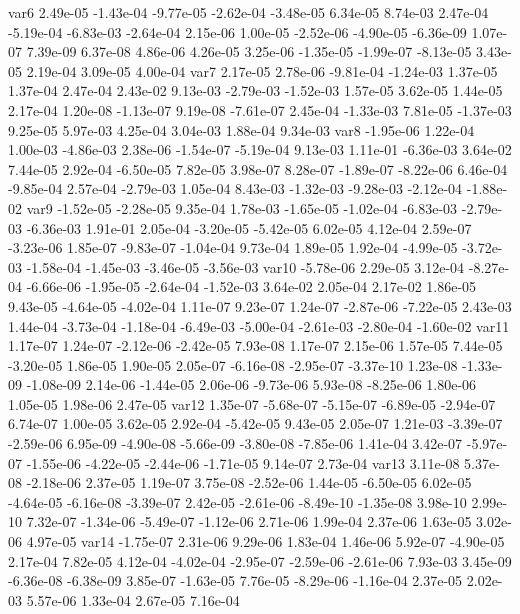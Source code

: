 var6  2.49e-05 -1.43e-04 -9.77e-05 -2.62e-04 -3.48e-05  6.34e-05  8.74e-03  2.47e-04 -5.19e-04 -6.83e-03 -2.64e-04  2.15e-06  1.00e-05 -2.52e-06 -4.90e-05 -6.36e-09  1.07e-07  7.39e-09  6.37e-08  4.86e-06  4.26e-05  3.25e-06 -1.35e-05 -1.99e-07 -8.13e-05  3.43e-05  2.19e-04  3.09e-05  4.00e-04
var7  2.17e-05  2.78e-06 -9.81e-04 -1.24e-03  1.37e-05  1.37e-04  2.47e-04  2.43e-02  9.13e-03 -2.79e-03 -1.52e-03  1.57e-05  3.62e-05  1.44e-05  2.17e-04  1.20e-08 -1.13e-07  9.19e-08 -7.61e-07  2.45e-04 -1.33e-03  7.81e-05 -1.37e-03  9.25e-05  5.97e-03  4.25e-04  3.04e-03  1.88e-04  9.34e-03
var8 -1.95e-06  1.22e-04  1.00e-03 -4.86e-03  2.38e-06 -1.54e-07 -5.19e-04  9.13e-03  1.11e-01 -6.36e-03  3.64e-02  7.44e-05  2.92e-04 -6.50e-05  7.82e-05  3.98e-07  8.28e-07 -1.89e-07 -8.22e-06  6.46e-04 -9.85e-04  2.57e-04 -2.79e-03  1.05e-04  8.43e-03 -1.32e-03 -9.28e-03 -2.12e-04 -1.88e-02
var9 -1.52e-05 -2.28e-05  9.35e-04  1.78e-03 -1.65e-05 -1.02e-04 -6.83e-03 -2.79e-03 -6.36e-03  1.91e-01  2.05e-04 -3.20e-05 -5.42e-05  6.02e-05  4.12e-04  2.59e-07 -3.23e-06  1.85e-07 -9.83e-07 -1.04e-04  9.73e-04  1.89e-05  1.92e-04 -4.99e-05 -3.72e-03 -1.58e-04 -1.45e-03 -3.46e-05 -3.56e-03
var10 -5.78e-06  2.29e-05  3.12e-04 -8.27e-04 -6.66e-06 -1.95e-05 -2.64e-04 -1.52e-03  3.64e-02  2.05e-04  2.17e-02  1.86e-05  9.43e-05 -4.64e-05 -4.02e-04  1.11e-07  9.23e-07  1.24e-07 -2.87e-06 -7.22e-05  2.43e-03  1.44e-04 -3.73e-04 -1.18e-04 -6.49e-03 -5.00e-04 -2.61e-03 -2.80e-04 -1.60e-02
var11  1.17e-07  1.24e-07 -2.12e-06 -2.42e-05  7.93e-08  1.17e-07  2.15e-06  1.57e-05  7.44e-05 -3.20e-05  1.86e-05  1.90e-05  2.05e-07 -6.16e-08 -2.95e-07 -3.37e-10  1.23e-08 -1.33e-09 -1.08e-09  2.14e-06 -1.44e-05  2.06e-06 -9.73e-06  5.93e-08 -8.25e-06  1.80e-06  1.05e-05  1.98e-06  2.47e-05
var12  1.35e-07 -5.68e-07 -5.15e-07 -6.89e-05 -2.94e-07  6.74e-07  1.00e-05  3.62e-05  2.92e-04 -5.42e-05  9.43e-05  2.05e-07  1.21e-03 -3.39e-07 -2.59e-06  6.95e-09 -4.90e-08 -5.66e-09 -3.80e-08 -7.85e-06  1.41e-04  3.42e-07 -5.97e-07 -1.55e-06 -4.22e-05 -2.44e-06 -1.71e-05  9.14e-07  2.73e-04
var13  3.11e-08  5.37e-08 -2.18e-06  2.37e-05  1.19e-07  3.75e-08 -2.52e-06  1.44e-05 -6.50e-05  6.02e-05 -4.64e-05 -6.16e-08 -3.39e-07  2.42e-05 -2.61e-06 -8.49e-10 -1.35e-08  3.98e-10  2.99e-10  7.32e-07 -1.34e-06 -5.49e-07 -1.12e-06  2.71e-06  1.99e-04  2.37e-06  1.63e-05  3.02e-06  4.97e-05
var14 -1.75e-07  2.31e-06  9.29e-06  1.83e-04  1.46e-06  5.92e-07 -4.90e-05  2.17e-04  7.82e-05  4.12e-04 -4.02e-04 -2.95e-07 -2.59e-06 -2.61e-06  7.93e-03  3.45e-09 -6.36e-08 -6.38e-09  3.85e-07 -1.63e-05  7.76e-05 -8.29e-06 -1.16e-04  2.37e-05  2.02e-03  5.57e-06  1.33e-04  2.67e-05  7.16e-04
